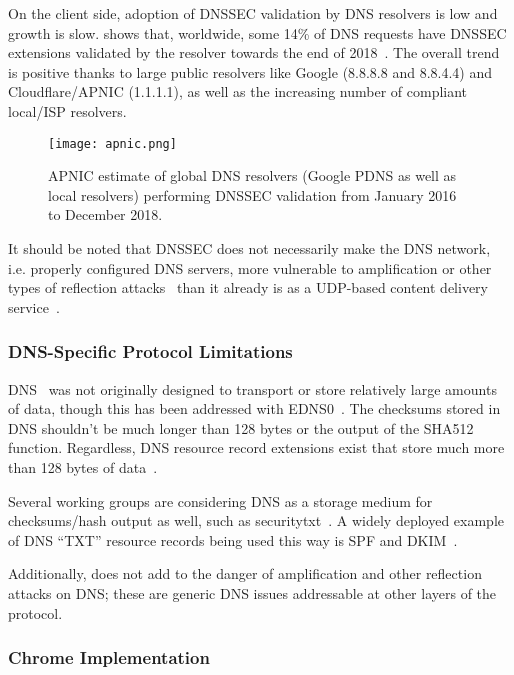 On the client side, adoption of DNSSEC validation by DNS resolvers is low and
growth is slow.  shows that, worldwide, some 14\% of DNS requests
have DNSSEC extensions validated by the resolver towards the end of
2018~\cite{APNIC}. The overall trend is positive thanks to large public
resolvers like Google (8.8.8.8 and 8.8.4.4) and Cloudflare/APNIC (1.1.1.1), as
well as the increasing number of compliant local/ISP resolvers.

\begin{figure}[t]
    \centering
    \texttt{[image: apnic.png]}
    \caption{APNIC estimate of global DNS resolvers (Google PDNS as well as
    local resolvers) performing DNSSEC validation from January 2016 to December
    2018.}\label{fig:apnic}
\end{figure}

It should be noted that DNSSEC does not necessarily make the DNS network, i.e.
properly configured DNS servers, more vulnerable to amplification or other types
of reflection attacks~\cite{Ariya} than it already is as a UDP-based content
delivery service~\cite{USCERT, Vixie}.

\subsubsection{DNS-Specific Protocol Limitations}

DNS~\cite{DNS1} was not originally designed to transport or store relatively
large amounts of data, though this has been addressed with EDNS0~\cite{EDNS}.
The checksums stored in DNS shouldn't be much longer than 128 bytes or the
output of the SHA512 function. Regardless, DNS resource record extensions exist
that store much more than 128 bytes of data~\cite{CERT, IPSECKEY, DANE3, DANE1}.

Several working groups are considering DNS as a storage medium for
checksums/hash output as well, such as securitytxt~\cite{draft-sectxt}. A widely
deployed example of DNS ``TXT'' resource records being used this way is SPF and
DKIM~\cite{DKIM}.

Additionally, \SYSTEM{} does not add to the danger of amplification and other
reflection attacks on DNS; these are generic DNS issues addressable at other
layers of the protocol.

\subsubsection{Chrome Implementation}

